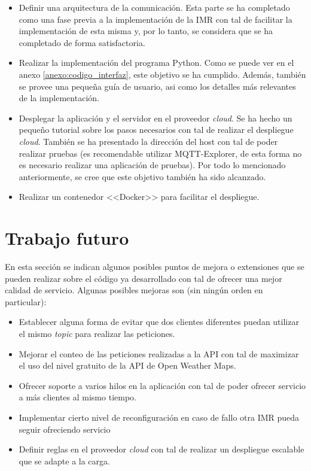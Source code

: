 \documentclass{scrbook}
\begin{document}
\begin{itemize}
    \item Definir una arquitectura de la comunicación. Esta parte se ha completado como una fase previa a la implementación de la IMR con tal de facilitar la implementación de esta misma y, por lo tanto, se considera que se ha completado de forma satisfactoria.
    \item Realizar la implementación del programa Python. Como se puede ver en el anexo \ref{anexo:codigo_interfaz}, este objetivo se ha cumplido. Además, también se provee una pequeña guía de usuario, asi como los detalles más relevantes de la implementación.
    \item Desplegar la aplicación y el servidor en el proveedor \textit{cloud}. Se ha hecho un pequeño tutorial sobre los pasos necesarios con tal de realizar el despliegue \textit{cloud}. También se ha presentado la dirección del host con tal de poder realizar pruebas (es recomendable utilizar MQTT-Explorer, de esta forma no es necesario realizar una aplicación de pruebas). Por todo lo mencionado anteriormente, se cree que este objetivo también ha sido alcanzado.
    \item Realizar un contenedor <<Docker>> para facilitar el despliegue.
\end{itemize}

\section{Trabajo futuro}

En esta sección se indican algunos posibles puntos de mejora o extensiones que se pueden realizar sobre el código ya desarrollado con tal de ofrecer una mejor calidad de servicio. Algunas posibles mejoras son (sin ningún orden en particular):

\begin{itemize}
    \item Establecer alguna forma de evitar que dos clientes diferentes puedan utilizar el mismo \textit{topic} para realizar las peticiones.
    \item Mejorar el conteo de las peticiones realizadas a la API con tal de maximizar el uso del nivel gratuito de la API de Open Weather Maps.
    \item Ofrecer soporte a varios hilos en la aplicación con tal de poder ofrecer servicio a más clientes al mismo tiempo.
    \item Implementar cierto nivel de reconfiguración en caso de fallo otra IMR pueda seguir ofreciendo servicio
    \item Definir reglas en el proveedor \textit{cloud} con tal de realizar un despliegue escalable que se adapte a la carga.
\end{itemize}
\end{document}
